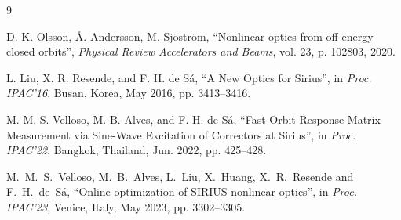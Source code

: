 \documentclass[%
               ]{jacow}
\begin{document}

\begin{thebibliography}{9}

    D. K. Olsson, Å. Andersson, M. Sjöström,
    \textquotedblleft{Nonlinear optics from off-energy closed orbits}\textquotedblright,
    \emph{Physical Review Accelerators and Beams}, vol. 23, p. 102803, 2020.

   L. Liu, X. R. Resende, and F. H. de Sá,
   \textquotedblleft{A New Optics for Sirius}\textquotedblright,
   in \emph{Proc. IPAC’16}, Busan, Korea, May 2016, pp. 3413--3416.
    
    M. M. S. Velloso, M. B. Alves, and F. H. de Sá,
    \textquotedblleft{Fast Orbit Response Matrix Measurement via Sine-Wave Excitation of Correctors at Sirius}\textquotedblright,
    in \emph{Proc. IPAC'22}, Bangkok, Thailand, Jun. 2022, pp. 425--428.
    
    
    
    M.~M.~S.~Velloso,  M.~B.~Alves, L.~Liu, X.~Huang, X.~R.~Resende and F.~H.~de~Sá,
    \textquotedblleft{Online optimization of SIRIUS nonlinear optics}\textquotedblright,
    in \emph{Proc. IPAC’23}, Venice, Italy, May 2023, pp. 3302--3305.
  
    
\end{thebibliography}
\end{document}
